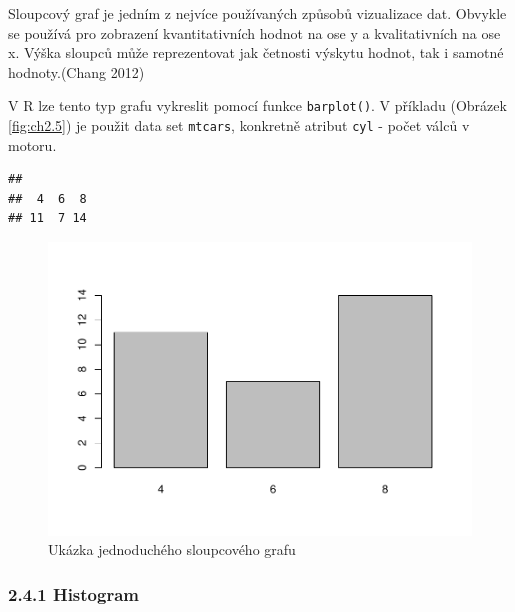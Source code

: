 \documentclass[12pt,]{article}
\newenvironment{Shaded}{\begin{snugshade}}{\end{snugshade}}
\newcommand{\KeywordTok}[1]{\textcolor[rgb]{0.13,0.29,0.53}{\textbf{#1}}}
\newcommand{\OperatorTok}[1]{\textcolor[rgb]{0.81,0.36,0.00}{\textbf{#1}}}
\newcommand{\NormalTok}[1]{#1}
\begin{document}
\qquad Sloupcový graf je jedním z nejvíce používaných způsobů
vizualizace dat. Obvykle se používá pro zobrazení kvantitativních hodnot
na ose y a kvalitativních na ose x. Výška sloupců může reprezentovat jak
četnosti výskytu hodnot, tak i samotné hodnoty.(Chang 2012)

\qquad V R lze tento typ grafu vykreslit pomocí funkce
\texttt{barplot()}. V příkladu (Obrázek \ref{fig:ch2.5}) je použit data
set \texttt{mtcars}, konkretně atribut \texttt{cyl} - počet válců v
motoru.

\begin{Shaded}
\end{Shaded}

\begin{verbatim}
## 
##  4  6  8 
## 11  7 14
\end{verbatim}

\begin{Shaded}
\end{Shaded}

\begin{figure}[H]

{\centering \includegraphics[width=0.55\linewidth]{BP_files/figure-latex/barplot-1} 

}

\caption{\label{fig:ch2.5} Ukázka jednoduchého sloupcového grafu}\label{fig:barplot}
\end{figure}

\hypertarget{hist}{\subsubsection{2.4.1 Histogram}\label{hist}}
\end{document}
